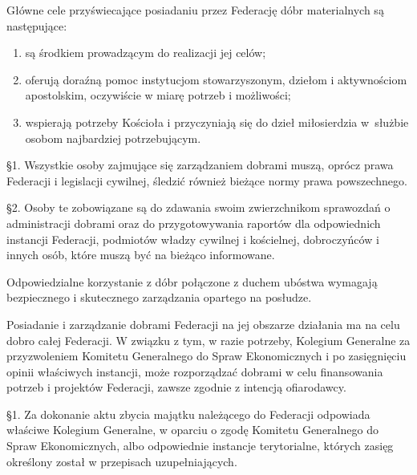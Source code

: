  Główne cele przyświecające posiadaniu przez Federację dóbr materialnych są następujące:


\begin{enumerate}


\item są środkiem prowadzącym do realizacji jej celów;


\item oferują doraźną pomoc instytucjom stowarzyszonym, dziełom i aktywnościom apostolskim, oczywiście w miarę potrzeb i możliwości;


\item wspierają potrzeby Kościoła i przyczyniają się do dzieł miłosierdzia \mbox{w służbie} osobom najbardziej potrzebującym.


\end{enumerate}
 


\filbreak{}


 \S{}1. Wszystkie osoby zajmujące się zarządzaniem dobrami muszą, oprócz prawa Federacji i legislacji cywilnej, śledzić również bieżące normy prawa powszechnego.


\S{}2. Osoby te zobowiązane są do zdawania swoim zwierzchnikom sprawozdań o administracji dobrami oraz do przygotowywania raportów dla odpowiednich instancji Federacji, podmiotów władzy cywilnej i kościelnej, dobroczyńców i innych osób, które muszą być na bieżąco informowane.




 Odpowiedzialne korzystanie z dóbr połączone z duchem ubóstwa wymagają bezpiecznego i skutecznego zarządzania opartego na posłudze.




 Posiadanie i zarządzanie dobrami Federacji na jej obszarze działania ma na celu dobro całej Federacji. W związku z tym, w razie potrzeby, Kolegium Generalne za przyzwoleniem Komitetu Generalnego do Spraw Ekonomicznych i po zasięgnięciu opinii właściwych instancji, może rozporządzać dobrami w celu finansowania potrzeb i projektów Federacji, zawsze zgodnie z intencją ofiarodawcy.
 


 \S{}1. Za dokonanie aktu zbycia majątku należącego do Federacji odpowiada właściwe Kolegium Generalne, w oparciu o zgodę Komitetu Generalnego do Spraw Ekonomicznych, albo odpowiednie instancje terytorialne, których zasięg określony został w przepisach uzupełniających.



